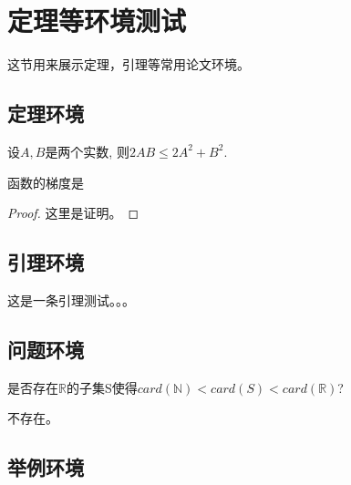 \section{定理等环境测试}这节用来展示定理，引理等常用论文环境。
 

\subsection{定理环境}

\begin{theorem}\label{thm2_1}

    设$A,B$是两个实数, 则$2AB\leq 2 A^2+B^2$.
    
\end{theorem}

\begin{definition}[函数性质]

    函数的梯度是
    
\end{definition}

\begin{proof}
    这里是证明。
\end{proof}

\subsection{引理环境}

\begin{lemma}[Nakayama引理]\label{lem2_2}
    这是一条引理测试。。。
\end{lemma}

\subsection{问题环境}

\begin{problem}[连续统假设]是否存在$\mathbb{R}$的子集S使得$card(\mathbb{N})<card(S)<card(\mathbb{R})$?
\end{problem}
\begin{solution}
    不存在。
\end{solution}

\subsection{举例环境}


